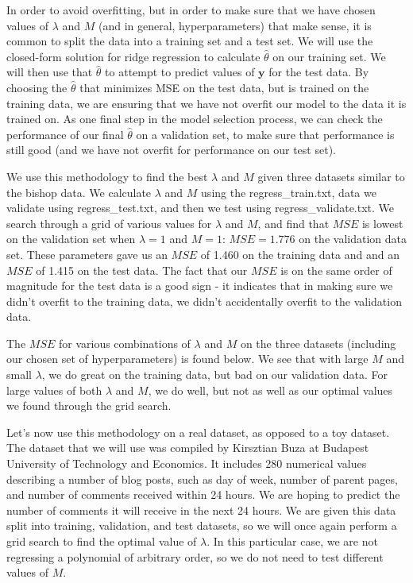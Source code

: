 \documentclass[10pt]{article}
\begin{document}
In order to avoid overfitting, but in order to make sure that we have chosen values of $\lambda$ and $M$ (and in general, hyperparameters) that make sense, it is common to split the data into a training set and a test set. We will use the closed-form solution for ridge regression to calculate $\hat{\theta}$ on our training set. We will then use that $\hat{\theta}$ to attempt to predict values of $\mathbf{y}$ for the test data. By choosing the $\hat{\theta}$ that minimizes MSE on the test data, but is trained on the training data, we are ensuring that we have not overfit our model to the data it is trained on. As one final step in the model selection process, we can check the performance of our final $\hat{\theta}$ on a validation set, to make sure that performance is still good (and we have not overfit for performance on our test set).

We use this methodology to find the best $\lambda$ and $M$ given three datasets similar to the bishop data. We calculate $\lambda$ and $M$ using the regress\_train.txt, data we validate using regress\_test.txt, and then we test using regress\_validate.txt. We search through a grid of various values for $\lambda$ and $M$, and find that $MSE$ is lowest on the validation set when $\lambda = 1$ and $M = 1$: $MSE = 1.776$ on the validation data set. These parameters gave us an $MSE$ of 1.460 on the training data and and an $MSE$ of 1.415 on the test data. The fact that our $MSE$ is on the same order of magnitude for the test data is a good sign - it indicates that in making sure we didn't overfit to the training data, we didn't accidentally overfit to the validation data.

The $MSE$ for various combinations of $\lambda$ and $M$ on the three datasets (including our chosen set of hyperparameters) is found below. We see that with large $M$ and small $\lambda$, we do great on the training data, but bad on our validation data. For large values of both $\lambda$ and $M$, we do well, but not as well as our optimal values we found through the grid search.

Let's now use this methodology on a real dataset, as opposed to a toy dataset. The dataset that we will use was compiled by Kirsztian Buza at Budapest University of Technology and Economics. It includes 280 numerical values describing a number of blog posts, such as day of week, number of parent pages, and number of comments received within 24 hours. We are hoping to predict the number of comments it will receive in the next 24 hours. We are given this data split into training, validation, and test datasets, so we will once again perform a grid search to find the optimal value of $\lambda$. In this particular case, we are not regressing a polynomial of arbitrary order, so we do not need to test different values of $M$.
\end{document}
